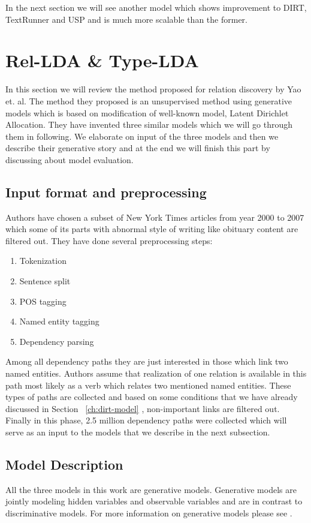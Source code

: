 \documentclass[12pt]{report}
\begin{document}
  In the next section we will see another model which shows improvement to DIRT, TextRunner and USP 
  and is much more scalable than the former.
     

\section{Rel-LDA \& Type-LDA}
\label{ch:unsupervised}

In this section we will review the method proposed for relation discovery  by Yao et. al. \cite{Riedel2013}  
The method they  proposed is an unsupervised method using generative models which is based on 
modification of well-known model, Latent Dirichlet Allocation. 
They have invented three similar models which we will go through them in following. 
We elaborate on input of the three models and then we describe their generative story 
and at the end we will finish this part by discussing about  model evaluation.

\subsection{Input format and preprocessing}
\label{ch:input}
Authors have chosen a subset of New York Times articles from year 2000 to 2007 which some of its parts with
abnormal style of writing like obituary content are filtered out.
They have done several preprocessing steps:
\begin{enumerate}
\item Tokenization
\item Sentence split
\item POS tagging %
\item Named entity tagging %
\item Dependency parsing %
\end{enumerate}
Among all dependency paths they are just interested in those which link two named entities.
 Authors assume that realization of one relation is available in this 
 path most likely as a verb which relates two mentioned named entities. These types of 
 paths are collected and based on some conditions that we have already discussed in Section ~\ref{ch:dirt-model} ,
  non-important links are filtered out.
 Finally in this phase, 2.5 million dependency paths were collected 
 which will serve as an input to the models that we describe in the next subsection.


\subsection {Model Description}
\label{ch:model}
All the three models in this work are generative models. Generative models are jointly modeling hidden variables and observable variables and 
are in contrast to discriminative models. For more information on generative models please see \cite{Murphy2012}.\\
\end{document}
